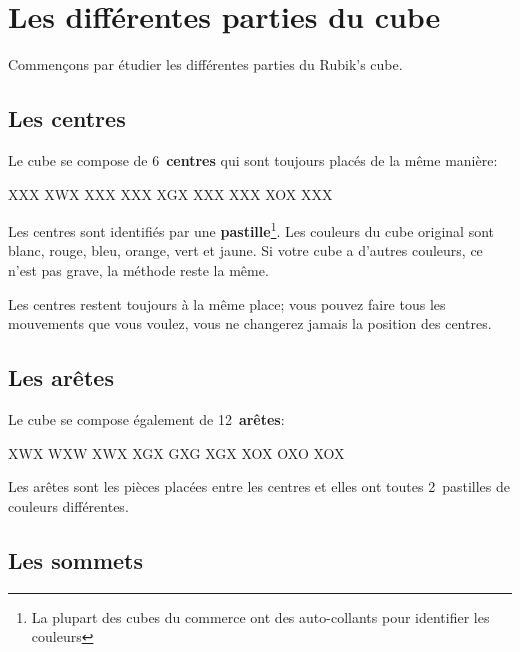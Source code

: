 \chapter{Les différentes parties du cube}

Commençons par étudier les différentes parties du Rubik's cube.

\section{Les centres}

Le cube se compose de 6~\textbf{centres} qui sont toujours placés de la même manière:

\begin{center}
	\RubikFaceUp%
	{X}{X}{X}%
	{X}{W}{X}%
	{X}{X}{X}
	\RubikFaceRight%
	{X}{X}{X}%
	{X}{G}{X}%
	{X}{X}{X}
	\RubikFaceFront%
	{X}{X}{X}%
	{X}{O}{X}%
	{X}{X}{X}
\end{center}

Les centres sont identifiés par une \textbf{pastille}\footnote{La plupart des cubes du commerce ont des auto-collants pour identifier les couleurs}. Les
couleurs du cube original sont blanc, rouge, bleu, orange, vert et jaune.
Si votre cube a d'autres couleurs, ce n'est pas grave, la méthode reste la
même.

Les centres restent toujours à la même place; vous pouvez faire tous les mouvements que vous voulez, vous ne changerez jamais la position des centres.

\section{Les arêtes}
\begin{samepage}
Le cube se compose également de 12~\textbf{arêtes}:

\begin{center}
	\RubikFaceUp%
	{X}{W}{X}%
	{W}{X}{W}%
	{X}{W}{X}
	\RubikFaceRight%
	{X}{G}{X}%
	{G}{X}{G}%
	{X}{G}{X}
	\RubikFaceFront%
	{X}{O}{X}%
	{O}{X}{O}%
	{X}{O}{X}
\end{center}
\end{samepage}

Les arêtes sont les pièces placées entre les centres et elles ont toutes 2~pastilles de couleurs différentes.

\section{Les sommets}

